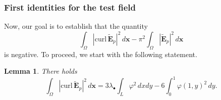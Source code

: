 \documentclass[11pt,a4paper]{article}
\newcommand{\dsp}{\displaystyle}
\newcommand{\Om}{\Omega}
\newcommand{\mrm}[1]{\mathrm{#1}}
\newcommand{\bfx}{\boldsymbol{x}}
\newcommand{\curlvec}{\boldsymbol{\mrm{curl}}\,}
\newcommand{\GL}{L}
\def\E{\boldsymbol{E}}
\newtheorem{lemma}[theorem]{Lemma}
\begin{document}
\subsubsection*{First identities for the test field}
Now, our goal is to establish that the quantity
\begin{equation}\label{QtyToEstimate}
\int_{\Om} |\curlvec\tilde{\E}_{p}|^2\,d\bfx-\pi^2\int_{\Om} |\tilde{\E}_{p}|^2\,d\bfx
\end{equation}
is negative. To proceed, we start with the following statement.
\begin{lemma}
There holds
\begin{equation}\label{EstimAbove}
\dsp\int_{\Om}|\curlvec \tilde{\E}_p|^2\,d\bfx=3\lambda_\bullet\int_\GL\varphi^2\,dxdy-6\int_0^1\varphi(1,y)^2\,dy.
\end{equation}
\end{lemma}
\end{document}
